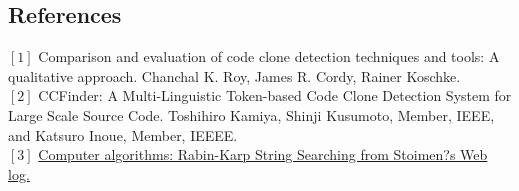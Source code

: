 \subsection{References}
$[1]$ Comparison and evaluation of code clone detection techniques and tools: A qualitative approach. Chanchal K. Roy, James R. Cordy, Rainer Koschke.\\
$[2]$ CCFinder: A Multi-Linguistic Token-based Code Clone Detection System for Large Scale Source Code. Toshihiro Kamiya, Shinji Kusumoto, Member, IEEE, and Katsuro Inoue, Member, IEEEE.\\
$[3]$ \href{http://www.stoimen.com/blog/2012/04/02/computer-algorithms-rabin-karp-string-searching/}{Computer algorithms: Rabin-Karp String Searching from Stoimen?s Web log.}\\